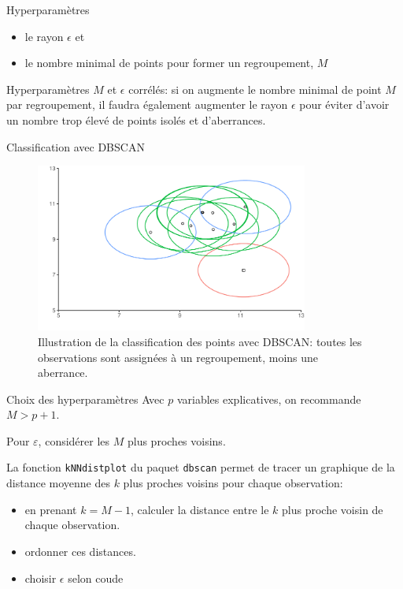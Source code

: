 \documentclass[
  ignorenonframetext,
]{beamer}
\providecommand{\tightlist}{%
  \setlength{\itemsep}{0pt}\setlength{\parskip}{0pt}}\usepackage{longtable,booktabs,array}
\begin{document}
\begin{frame}{Hyperparamètres}
\protect\hypertarget{hyperparamuxe8tres-1}{}
\begin{itemize}
\tightlist
\item
  le rayon \(\epsilon\) et
\item
  le nombre minimal de points pour former un regroupement, \(M\)
\end{itemize}

Hyperparamètres \(M\) et \(\epsilon\) corrélés: si on augmente le nombre
minimal de point \(M\) par regroupement, il faudra également augmenter
le rayon \(\epsilon\) pour éviter d'avoir un nombre trop élevé de points
isolés et d'aberrances.
\end{frame}

\begin{frame}{Classification avec DBSCAN}
\protect\hypertarget{classification-avec-dbscan}{}
\begin{figure}

{\centering \includegraphics[width=0.8\textwidth,height=\textheight]{MATH60602-diapos12_files/figure-beamer/fig-dbscan1-1.pdf}

}

\caption{\label{fig-dbscan1}Illustration de la classification des points
avec DBSCAN: toutes les observations sont assignées à un regroupement,
moins une aberrance.}

\end{figure}
\end{frame}

\begin{frame}[fragile]{Choix des hyperparamètres}
\protect\hypertarget{choix-des-hyperparamuxe8tres}{}
Avec \(p\) variables explicatives, on recommande \(M > p+1\).

Pour \(\varepsilon\), considérer les \(M\) plus proches voisins.

La fonction \texttt{kNNdistplot} du paquet \texttt{dbscan} permet de
tracer un graphique de la distance moyenne des \(k\) plus proches
voisins pour chaque observation:

\begin{itemize}
\tightlist
\item
  en prenant \(k=M-1\), calculer la distance entre le \(k\) plus proche
  voisin de chaque observation.
\item
  ordonner ces distances.
\item
  choisir \(\epsilon\) selon coude
\end{itemize}
\end{frame}
\end{document}

